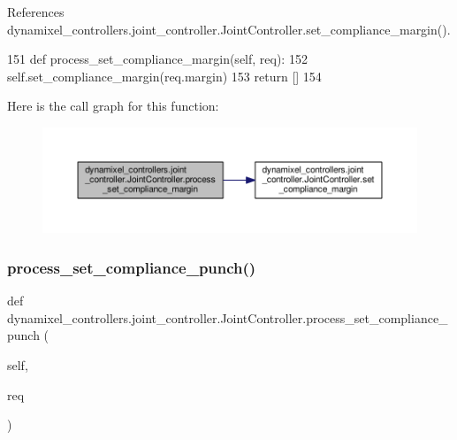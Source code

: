 References dynamixel\+\_\+controllers.\+joint\+\_\+controller.\+Joint\+Controller.\+set\+\_\+compliance\+\_\+margin().


\begin{DoxyCode}
151     \textcolor{keyword}{def }process\_set\_compliance\_margin(self, req):
152         self.set\_compliance\_margin(req.margin)
153         \textcolor{keywordflow}{return} []
154 
\end{DoxyCode}
Here is the call graph for this function\+:
\nopagebreak
\begin{figure}[H]
\begin{center}
\leavevmode
\includegraphics[width=350pt]{d3/dcd/classdynamixel__controllers_1_1joint__controller_1_1_joint_controller_aed0bae387958b56f88fd707e9da9e8f1_cgraph}
\end{center}
\end{figure}
\mbox{\label{classdynamixel__controllers_1_1joint__controller_1_1_joint_controller_ac3d7aea8d47f24ab10c1162f34cce44f}} 
\subsubsection{\texorpdfstring{process\+\_\+set\+\_\+compliance\+\_\+punch()}{process\_set\_compliance\_punch()}}
{\footnotesize\ttfamily def dynamixel\+\_\+controllers.\+joint\+\_\+controller.\+Joint\+Controller.\+process\+\_\+set\+\_\+compliance\+\_\+punch (\begin{DoxyParamCaption}\item[{}]{self,  }\item[{}]{req }\end{DoxyParamCaption})}



